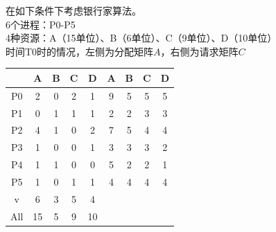 \begin{example}
    在如下条件下考虑银行家算法。\\
    6个进程：P0-P5\\
    4种资源：A（15单位）、B（6单位）、C（9单位）、D（10单位）\\
    时间T0时的情况，左侧为分配矩阵$A$，右侧为请求矩阵$C$
    \begin{center}
        \begin{tabular}{|c|c|c|c|c||c|c|c|c|}\hline
            & A & B & C & D & A & B & C & D\\\hline
            P0 & 2 & 0 & 2 & 1 & 9 & 5 & 5 & 5\\\hline
            P1 & 0 & 1 & 1 & 1 & 2 & 2 & 3 & 3\\\hline
            P2 & 4 & 1 & 0 & 2 & 7 & 5 & 4 & 4\\\hline
            P3 & 1 & 0 & 0 & 1 & 3 & 3 & 3 & 2\\\hline
            P4 & 1 & 1 & 0 & 0 & 5 & 2 & 2 & 1\\\hline
            P5 & 1 & 0 & 1 & 1 & 4 & 4 & 4 & 4\\\hline
            v & 6 & 3 & 5 & 4 & & & &\\\hline
            All & 15 & 5 & 9 & 10 & & & &\\\hline
        \end{tabular}
    \end{center}
\end{example}
